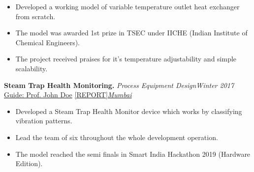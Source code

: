 \documentclass[10pt]{article}
\begin{document}
\begin{itemize}[itemsep = -0.75 mm, leftmargin=*]
    \item Developed a working model of variable temperature outlet heat exchanger from scratch.
    \item The model was awarded 1st prize in TSEC under IICHE (Indian Institute of Chemical Engineers).
    \item The project received praises for it's temperature adjustability and simple scalability.
\end{itemize}
\textbf{\large Steam Trap Health Monitoring.} \textemdash \textit{ Process Equipment Design}\hfill{\sl \small Winter 2017}\\
 \href{https://johndoe.com}{Guide: Prof. John Doe}\hspace{10pt} \href{https://www.github.com/aovi14/process_sim}{[REPORT]}\hfill{\sl \small \href{https://www.mumbai.com}{Mumbai}}\\\vspace{-15pt}
\begin{itemize}[itemsep = -0.75 mm, leftmargin=*]
    \item Developed a Steam Trap Health Monitor device which works by classifying vibration patterns.
    \item Lead the team of six throughout the whole development operation.
    \item The model reached the semi finals in Smart India Hackathon 2019 (Hardware Edition).
\end{itemize}
\vspace*{-3pt}
\end{document}
